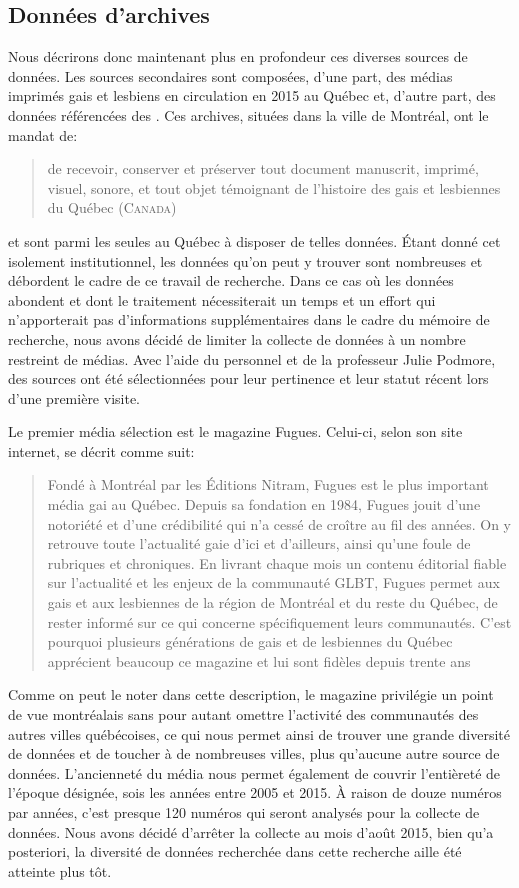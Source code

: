 \subsection{Données d'archives}
\label{sub:donn_es_d_archives}
Nous décrirons donc maintenant plus en profondeur ces diverses sources de données. 
Les sources secondaires sont composées, d'une part, des médias imprimés gais et lesbiens en circulation en 2015 au Québec et, d'autre part, des données référencées des \agq{}. 
Ces archives, situées dans la ville de Montréal, ont le mandat de: \blockquote[{\cite{LAGQ2014}}][.]{\textelp{} de recevoir,   conserver et préserver tout document manuscrit, imprimé, visuel, sonore, et   tout objet témoignant de l'histoire des gais et lesbiennes du Québec   (\textsc{Canada})} et sont parmi les seules au Québec à disposer de telles données. 
Étant donné cet isolement institutionnel, les données qu'on peut y trouver sont nombreuses et débordent le cadre de ce travail de recherche. 
Dans ce cas où les données abondent et dont le traitement nécessiterait un temps et un effort qui n'apporterait pas d'informations supplémentaires dans le cadre du mémoire de recherche, nous avons décidé de limiter la collecte de données à un nombre restreint de médias. 
Avec l'aide du personnel et de la professeur Julie Podmore, des sources ont été sélectionnées pour leur pertinence et leur statut récent lors d'une première visite.

Le premier média sélection est le magazine Fugues. 
Celui-ci, selon son site internet, se décrit comme suit: \blockquote[{\cite{LesNitram2015}}][.]{
  Fondé à Montréal par les Éditions Nitram, Fugues est le plus important média gai au Québec. 
Depuis sa fondation en 1984, Fugues jouit d’une notoriété et d’une crédibilité qui n’a cessé de croître au fil des années. 
On y retrouve toute l’actualité gaie d’ici et d’ailleurs, ainsi qu'une foule de rubriques et chroniques. 
En livrant chaque mois un contenu éditorial fiable sur l’actualité et les enjeux de la communauté GLBT, Fugues permet aux gais et aux lesbiennes de la région de Montréal et du reste du Québec, de rester informé sur ce qui concerne spécifiquement leurs communautés. 
C’est pourquoi plusieurs générations de gais et de lesbiennes du Québec apprécient beaucoup ce magazine et lui sont fidèles depuis trente ans} 
Comme on peut le noter dans cette description, le magazine privilégie un point de vue montréalais sans pour autant omettre l'activité des communautés \lgbt{} des autres villes québécoises, ce qui nous permet ainsi de trouver une grande diversité de données et de toucher à de nombreuses villes, plus qu'aucune autre source de données. 
L'ancienneté du média nous permet également de couvrir l'entièreté de l'époque désignée, sois les années entre 2005 et 2015. 
À raison de douze numéros par années, c'est presque 120 numéros qui seront analysés pour la collecte de données. 
Nous avons décidé d'arrêter la collecte au mois d'août 2015, bien qu'a posteriori, la diversité de données recherchée dans cette recherche aille été atteinte plus tôt.

